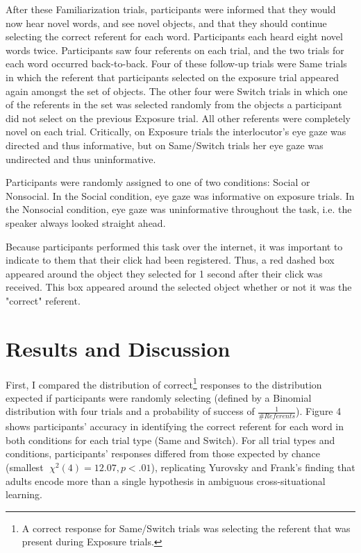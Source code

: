 \documentclass[10pt,letterpaper]{article}
\begin{document}
After these Familiarization trials, participants were informed that they would now hear
novel words, and see novel objects, and that they should continue selecting the correct
referent for each word. Participants each heard eight novel words twice. Participants saw four referents
on each trial, and the two trials for each word occurred back-to-back. Four of these
follow-up trials were Same trials in which the referent that participants selected on the exposure trial appeared again amongst the set of objects. The other four were
Switch trials in which one of the referents in the set was selected randomly from the objects
a participant did not select on the previous Exposure trial. All other referents were
completely novel on each trial. Critically, on Exposure trials the interlocutor's eye gaze was directed and thus informative, but on Same/Switch trials her eye gaze was undirected and thus uninformative. 

Participants were randomly assigned to one of two conditions: Social or Nonsocial. In the Social condition, eye gaze was informative on exposure trials. In the Nonsocial condition, eye gaze was uninformative throughout the task, i.e. the speaker always looked straight ahead. 

Because participants performed this task over the internet, it was important to
indicate to them that their click had been registered. Thus, a red dashed box appeared
around the object they selected for 1 second after their click was received. This box
appeared around the selected object whether or not it was the "correct" referent.

\section{Results and Discussion}

First, I compared the distribution of correct\footnote{A correct response for Same/Switch trials was selecting the referent that was present during Exposure trials.} responses to the distribution expected if participants were randomly selecting (defined by a Binomial distribution with four trials and a probability of success of $\frac{1}{\#Referents}$). Figure 4 shows participants' accuracy in identifying the correct referent for each word in both conditions for each trial type (Same and Switch). For all trial types and conditions, participants' responses differed from those expected by chance (smallest $\chi^{2}(4) = 12.07, p < .01$), replicating Yurovsky and Frank's finding that adults encode more than a single hypothesis in ambiguous cross-situational learning. 
\end{document}
